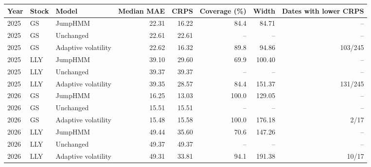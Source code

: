 \begin{tabular}{lllrrrrr}
\toprule
Year & Stock & Model & Median MAE & CRPS & Coverage (\%) & Width & Dates with lower CRPS \\
\midrule
2025 & GS & JumpHMM & 22.31 & 16.22 & 84.4 & 84.71 & -- \\
2025 & GS & Unchanged & 22.61 & 22.61 & -- & -- & -- \\
2025 & GS & Adaptive volatility & 22.62 & 16.32 & 89.8 & 94.86 & 103/245 \\
2025 & LLY & JumpHMM & 39.10 & 29.60 & 69.9 & 100.40 & -- \\
2025 & LLY & Unchanged & 39.37 & 39.37 & -- & -- & -- \\
2025 & LLY & Adaptive volatility & 39.35 & 28.57 & 84.4 & 151.37 & 131/245 \\
2026 & GS & JumpHMM & 16.25 & 13.03 & 100.0 & 129.05 & -- \\
2026 & GS & Unchanged & 15.51 & 15.51 & -- & -- & -- \\
2026 & GS & Adaptive volatility & 15.48 & 15.58 & 100.0 & 176.18 & 2/17 \\
2026 & LLY & JumpHMM & 49.44 & 35.60 & 70.6 & 147.26 & -- \\
2026 & LLY & Unchanged & 49.37 & 49.37 & -- & -- & -- \\
2026 & LLY & Adaptive volatility & 49.31 & 33.81 & 94.1 & 191.38 & 10/17 \\
\bottomrule
\end{tabular}
